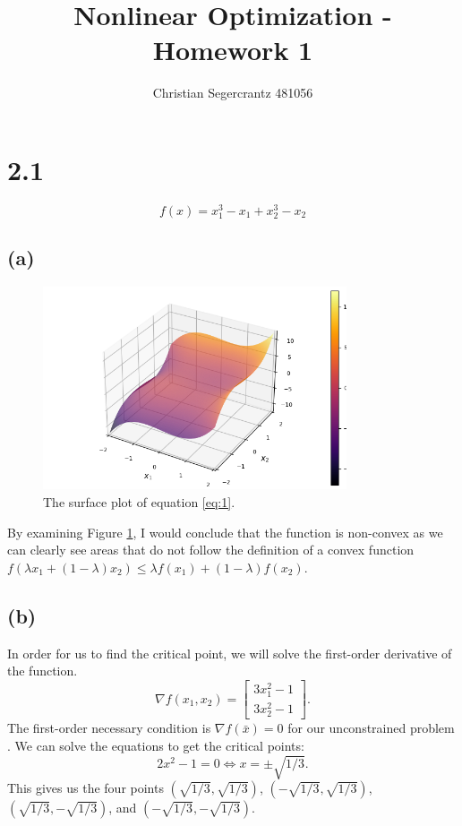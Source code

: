 \documentclass{article}
\title{Nonlinear Optimization - Homework 1 }
\author{Christian Segercrantz 481056}
\begin{document}
	\maketitle
	\pagebreak
\section*{2.1}
\begin{equation} \label{eq:1}
	f(x) = x_1^3-x_1+x_2^3-x_2
\end{equation}
\subsection*{(a)}
	\begin{figure}[H]
		\includegraphics[width=0.8\textwidth]{H21_surface.png}
		\caption{The surface plot of equation \eqref{eq:1}.}
		\label{fig:1a}
	\end{figure}
	By examining Figure \ref{fig:1a}, I would conclude that the function is non-convex as we can clearly see areas that do not follow the definition of a convex function $f(\lambda x_1 + (1 - \lambda)x_2 ) \leq \lambda f(x_1 ) + (1 - \lambda)f(x_2)$.
\subsection*{(b)}
	In order for us to find the critical point, we will solve the first-order derivative of the function.
	\begin{equation}
		\nabla f(x_1,x_2) =
		\begin{bmatrix}
			3x_1^2-1 \\
			3x_2^2-1
		\end{bmatrix}.
	\end{equation}
	The first-order necessary condition is $\nabla f(\bar{x}) = 0$ for our unconstrained problem . We can solve the equations to get the critical points:
	\begin{equation}
		2x^2-1 = 0 \iff x= \pm\sqrt{1/3}.
	\end{equation}
	This gives us the four points $(\sqrt{1/3},\sqrt{1/3})$, $(-\sqrt{1/3},\sqrt{1/3})$, $(\sqrt{1/3},-\sqrt{1/3})$, and $(-\sqrt{1/3},-\sqrt{1/3})$.
\end{document}
